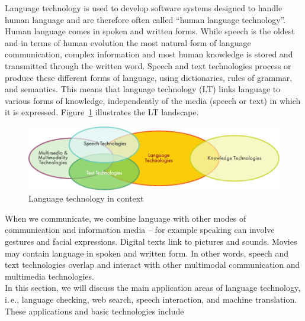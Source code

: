   \clearpage


  \begin{multicols}{2}

  Language technology is used to develop software systems designed to handle human language and are therefore often called “human language technology”. Human language comes in spoken and written forms. While speech is the oldest and in terms of human evolution the most natural form of language communication, complex information and most human knowledge is stored and transmitted through the written word. Speech and text technologies process or produce these different forms of language, using dictionaries, rules of grammar, and semantics. This means that language technology (LT) links language to various forms of knowledge, independently of the media (speech or text) in which it is expressed. Figure~\ref{fig:ltincontext_en} illustrates the LT landscape.

  \begin{figure}[htb]
    \center
    \includegraphics[width=\textwidth]{../_media/english/language_technologies}
    \caption{Language technology in context}
    \label{fig:ltincontext_en}
  \end{figure}

  When we communicate, we combine language with other modes of communication and information media – for example speaking can involve gestures and facial expressions. Digital texts link to pictures and sounds. Movies may contain language in spoken and written form. In other words, speech and text technologies overlap and interact with other multimodal communication and multimedia technologies.\\ 
  In this section, we will discuss the main application areas of language technology, i.\,e., language checking, web search, speech interaction, and machine translation. These applications and basic technologies include 


\end{multicols}
